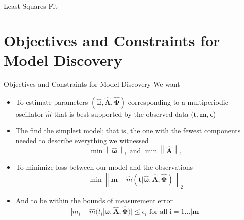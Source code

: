 \documentclass{beamer}
\begin{document}
\begin{frame}{Least Squares Fit}
\begin{figure}
\centering

\end{figure} 
\end{frame}

\section{Objectives and Constraints for Model Discovery}
\begin{frame}{Objectives and Constraints for Model Discovery}
We want
\begin{itemize}
\item To estimate parameters $(\boldsymbol{\hat \omega}, \mathbf {\hat A}, \boldsymbol{\hat \Phi})$ corresponding to a multiperiodic oscillator $\hat m$ that is best supported by the observed data ($\mathbf{t}, \mathbf{m}, \boldsymbol \epsilon$) \pause 

\item The find the simplest model; that is, the one with the fewest components needed to describe everything we witnessed 
$$\min \left\| \boldsymbol{\hat \omega} \right\|_1 \text{ and } \min \left\| \mathbf{\hat{A}} \right\|_1$$ \pause

\item To minimize loss between our model and the observations
$$\min \left\| \mathbf m - \hat m(\mathbf t | \boldsymbol{\hat \omega}, \mathbf {\hat A}, \boldsymbol{\hat \Phi})\right\|_2$$ \pause

\item And to be within the bounds of measurement error
$$|m_i - \hat m(t_i | \boldsymbol{\hat \omega}, \mathbf {\hat A}, \boldsymbol{\hat \Phi})| \leq \epsilon_i \text{ for all i}=1\ldots |\mathbf{m}| $$

\end{itemize}
\end{frame}
\end{document}
